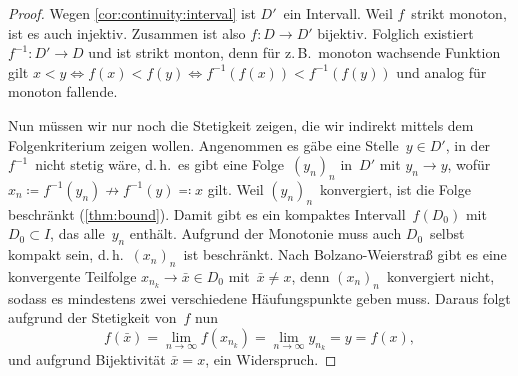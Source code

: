 \documentclass[a4paper]{article}
\begin{document}
\begin{proof}
    Wegen \cref{cor:continuity:interval} ist $D'$~ein Intervall. Weil $f$~strikt monoton, ist es auch injektiv. Zusammen ist also $f\colon D \to D'$ bijektiv. Folglich existiert $f^{-1}\colon D' \to D$ und ist strikt monton, denn für z.\,B.\ monoton wachsende Funktion gilt $x < y \iff f(x) < f(y) \iff f^{-1}(f(x)) < f^{-1}(f(y))$ und analog für monoton fallende.

    Nun müssen wir nur noch die Stetigkeit zeigen, die wir indirekt mittels dem Folgenkriterium zeigen wollen. Angenommen es gäbe eine Stelle~$y \in D'$, in der $f^{-1}$~nicht stetig wäre, d.\,h.\ es gibt eine Folge~$(y_n)_n$ in~$D'$ mit $y_n \to y$, wofür $x_n \coloneqq f^{-1}(y_n) \not\to f^{-1}(y) \eqqcolon x$ gilt. Weil $(y_n)_n$~konvergiert, ist die Folge beschränkt (\cref{thm:bound}). Damit gibt es ein kompaktes Intervall~$f(D_0)$ mit~$D_0 \subset I$, das alle~$y_n$ enthält. Aufgrund der Monotonie muss auch $D_0$~selbst kompakt sein, d.\,h.\ $(x_n)_n$~ist beschränkt. Nach Bolzano-Weierstraß gibt es eine konvergente Teilfolge $x_{n_k} \to \bar{x} \in D_0$ mit~$\bar{x} \neq x$, denn $(x_n)_n$~konvergiert nicht, sodass es mindestens zwei verschiedene Häufungspunkte geben muss. Daraus folgt aufgrund der Stetigkeit von~$f$ nun
    \begin{equation*}
        f(\bar{x}) = \lim_{n\to\infty} f(x_{n_k}) = \lim_{n\to\infty} y_{n_k} = y = f(x),
    \end{equation*}
    und aufgrund Bijektivität $\bar{x} = x$, ein Widerspruch.
\end{proof}
\end{document}
